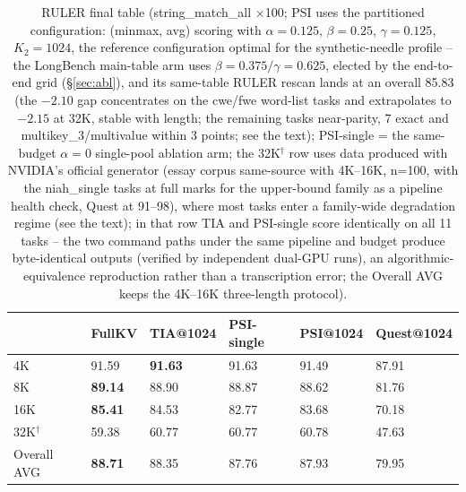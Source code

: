 \documentclass[11pt]{article}
\begin{document}
\begin{table}[h]\centering
\caption{RULER final table (string\_match\_all $\times$100; PSI uses the partitioned configuration: (minmax, avg) scoring with $\alpha{=}0.125$, $\beta{=}0.25$, $\gamma{=}0.125$, $K_2{=}1024$, the reference configuration optimal for the synthetic-needle profile -- the LongBench main-table arm uses $\beta{=}0.375/\gamma{=}0.625$, elected by the end-to-end grid (\S\ref{sec:abl}), and its same-table RULER rescan lands at an overall 85.83 (the $-2.10$ gap concentrates on the cwe/fwe word-list tasks and extrapolates to $-2.15$ at 32K, stable with length; the remaining tasks near-parity, 7 exact and multikey\_3/multivalue within 3 points; see the text); PSI-single = the same-budget $\alpha{=}0$ single-pool ablation arm; the 32K$^\dagger$ row uses data produced with NVIDIA's official generator (essay corpus same-source with 4K--16K, n=100, with the niah\_single tasks at full marks for the upper-bound family as a pipeline health check, Quest at 91--98), where most tasks enter a family-wide degradation regime (see the text); in that row TIA and PSI-single score identically on all 11 tasks -- the two command paths under the same pipeline and budget produce byte-identical outputs (verified by independent dual-GPU runs), an algorithmic-equivalence reproduction rather than a transcription error; the Overall AVG keeps the 4K--16K three-length protocol).}
\begin{tabular}{llllll}
\toprule
 & FullKV & TIA@1024 & PSI-single & PSI@1024 & Quest@1024 \\
\midrule
4K & 91.59 & \textbf{91.63} & 91.63 & 91.49 & 87.91 \\
8K & \textbf{89.14} & 88.90 & 88.87 & 88.62 & 81.76 \\
16K & \textbf{85.41} & 84.53 & 82.77 & 83.68 & 70.18 \\
32K$^\dagger$ & 59.38 & 60.77 & 60.77 & 60.78 & 47.63 \\
\addlinespace
Overall AVG & \textbf{88.71} & 88.35 & 87.76 & 87.93 & 79.95 \\
\bottomrule
\end{tabular}
\label{tab:ruler}
\end{table}
\end{document}
